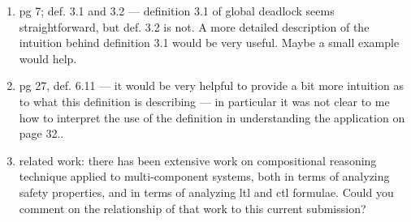 \begin{enumerate}
\item pg 7; def. 3.1 and 3.2 --- definition 3.1 of global deadlock seems straightforward, but
def. 3.2 is not.  A more detailed description of the intuition behind definition 3.1 would
be very useful.  Maybe a small example would help.

\item pg 27, def. 6.11 --- it would be very helpful to provide a bit more
intuition as to what this definition is describing --- in particular it was not
clear to me how to interpret the use of the definition in understanding the
application on page 32..

\item  related work: there has been extensive work on compositional reasoning
technique applied to multi-component systems, both in terms of analyzing
safety properties, and in terms of analyzing ltl and ctl formulae.  Could you comment
on the relationship of that work to this current submission?

\end{enumerate}






